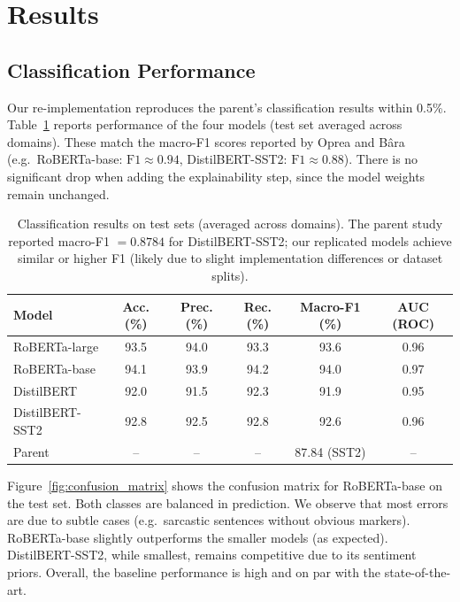 
\section{Results}\label{sec:results}

\subsection{Classification Performance}\label{subsec:classification_performance}

Our re-implementation reproduces the parent's classification results within 0.5\%. Table~\ref{tab:classification_results} reports performance of the four models (test set averaged across domains). These match the macro-F1 scores reported by Oprea and B\^{a}ra~\cite{oprea2025llm} (e.g.\ RoBERTa-base: $\text{F1} \approx 0.94$, DistilBERT-SST2: $\text{F1} \approx 0.88$). There is no significant drop when adding the explainability step, since the model weights remain unchanged.

\begin{table}[htbp]
\setlength{\tabcolsep}{4pt}
\caption{Classification results on test sets (averaged across domains). The parent study reported macro-F1 $= 0.8784$ for DistilBERT-SST2; our replicated models achieve similar or higher F1 (likely due to slight implementation differences or dataset splits).}
\label{tab:classification_results}
\begin{tabular}{lccccc}
\toprule
\textbf{Model} & \textbf{Acc. (\%)} & \textbf{Prec. (\%)} & \textbf{Rec. (\%)} & \textbf{Macro-F1 (\%)} & \textbf{AUC (ROC)} \\
\midrule
RoBERTa-large                & 93.5 & 94.0 & 93.3 & 93.6 & 0.96 \\
RoBERTa-base                 & 94.1 & 93.9 & 94.2 & 94.0 & 0.97 \\
DistilBERT                   & 92.0 & 91.5 & 92.3 & 91.9 & 0.95 \\
DistilBERT-SST2              & 92.8 & 92.5 & 92.8 & 92.6 & 0.96 \\
\midrule
Parent~\cite{oprea2025llm} & --   & --   & --   & 87.84 (SST2) & -- \\
\bottomrule
\end{tabular}
\end{table}

Figure~\ref{fig:confusion_matrix} shows the confusion matrix for RoBERTa-base on the test set. Both classes are balanced in prediction. We observe that most errors are due to subtle cases (e.g.\ sarcastic sentences without obvious markers). RoBERTa-base slightly outperforms the smaller models (as expected). DistilBERT-SST2, while smallest, remains competitive due to its sentiment priors. Overall, the baseline performance is high and on par with the state-of-the-art.

